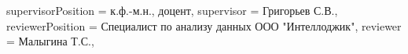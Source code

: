 {    %
    supervisorPosition = {к.ф.-м.н., доцент}, %
    supervisor         = {Григорьев С.В.},  
    reviewerPosition   = {Специалист по анализу данных ООО "Интеллоджик"},
    reviewer           = {Малыгина Т.С.},
}

